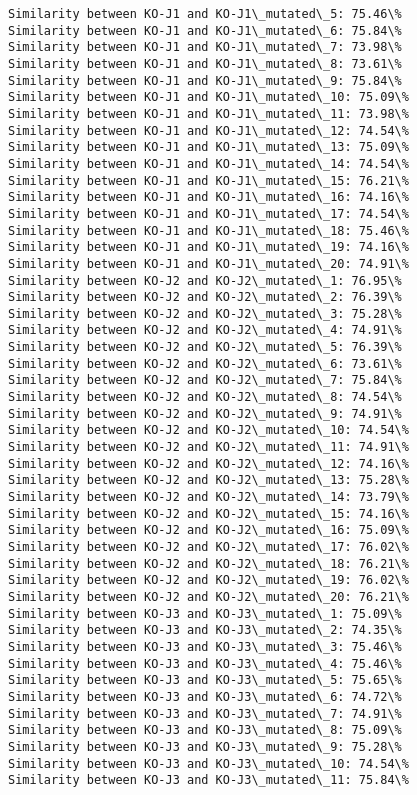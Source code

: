 \documentclass[11pt]{article}
\begin{document}
\begin{Verbatim}[commandchars=\\\{\}]
Similarity between KO-J1 and KO-J1\_mutated\_5: 75.46\%
Similarity between KO-J1 and KO-J1\_mutated\_6: 75.84\%
Similarity between KO-J1 and KO-J1\_mutated\_7: 73.98\%
Similarity between KO-J1 and KO-J1\_mutated\_8: 73.61\%
Similarity between KO-J1 and KO-J1\_mutated\_9: 75.84\%
Similarity between KO-J1 and KO-J1\_mutated\_10: 75.09\%
Similarity between KO-J1 and KO-J1\_mutated\_11: 73.98\%
Similarity between KO-J1 and KO-J1\_mutated\_12: 74.54\%
Similarity between KO-J1 and KO-J1\_mutated\_13: 75.09\%
Similarity between KO-J1 and KO-J1\_mutated\_14: 74.54\%
Similarity between KO-J1 and KO-J1\_mutated\_15: 76.21\%
Similarity between KO-J1 and KO-J1\_mutated\_16: 74.16\%
Similarity between KO-J1 and KO-J1\_mutated\_17: 74.54\%
Similarity between KO-J1 and KO-J1\_mutated\_18: 75.46\%
Similarity between KO-J1 and KO-J1\_mutated\_19: 74.16\%
Similarity between KO-J1 and KO-J1\_mutated\_20: 74.91\%
Similarity between KO-J2 and KO-J2\_mutated\_1: 76.95\%
Similarity between KO-J2 and KO-J2\_mutated\_2: 76.39\%
Similarity between KO-J2 and KO-J2\_mutated\_3: 75.28\%
Similarity between KO-J2 and KO-J2\_mutated\_4: 74.91\%
Similarity between KO-J2 and KO-J2\_mutated\_5: 76.39\%
Similarity between KO-J2 and KO-J2\_mutated\_6: 73.61\%
Similarity between KO-J2 and KO-J2\_mutated\_7: 75.84\%
Similarity between KO-J2 and KO-J2\_mutated\_8: 74.54\%
Similarity between KO-J2 and KO-J2\_mutated\_9: 74.91\%
Similarity between KO-J2 and KO-J2\_mutated\_10: 74.54\%
Similarity between KO-J2 and KO-J2\_mutated\_11: 74.91\%
Similarity between KO-J2 and KO-J2\_mutated\_12: 74.16\%
Similarity between KO-J2 and KO-J2\_mutated\_13: 75.28\%
Similarity between KO-J2 and KO-J2\_mutated\_14: 73.79\%
Similarity between KO-J2 and KO-J2\_mutated\_15: 74.16\%
Similarity between KO-J2 and KO-J2\_mutated\_16: 75.09\%
Similarity between KO-J2 and KO-J2\_mutated\_17: 76.02\%
Similarity between KO-J2 and KO-J2\_mutated\_18: 76.21\%
Similarity between KO-J2 and KO-J2\_mutated\_19: 76.02\%
Similarity between KO-J2 and KO-J2\_mutated\_20: 76.21\%
Similarity between KO-J3 and KO-J3\_mutated\_1: 75.09\%
Similarity between KO-J3 and KO-J3\_mutated\_2: 74.35\%
Similarity between KO-J3 and KO-J3\_mutated\_3: 75.46\%
Similarity between KO-J3 and KO-J3\_mutated\_4: 75.46\%
Similarity between KO-J3 and KO-J3\_mutated\_5: 75.65\%
Similarity between KO-J3 and KO-J3\_mutated\_6: 74.72\%
Similarity between KO-J3 and KO-J3\_mutated\_7: 74.91\%
Similarity between KO-J3 and KO-J3\_mutated\_8: 75.09\%
Similarity between KO-J3 and KO-J3\_mutated\_9: 75.28\%
Similarity between KO-J3 and KO-J3\_mutated\_10: 74.54\%
Similarity between KO-J3 and KO-J3\_mutated\_11: 75.84\%

\end{Verbatim}
\end{document}
